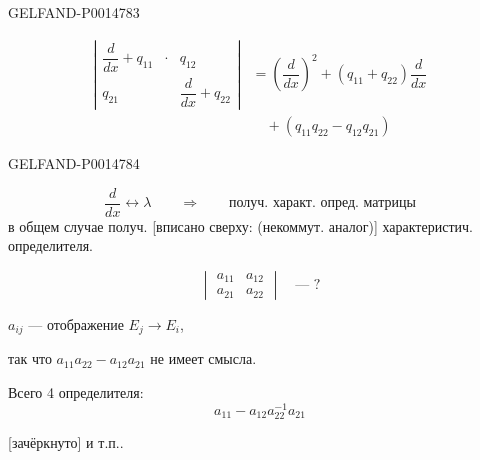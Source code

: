 \begin{GelfandAdjacentEvidence}{GELFAND-P001478}{3}


\begin{equation*}
\begin{aligned}
\left|\begin{array}{ccc}
\dfrac{d}{dx}+q_{11}&\cdot&q_{12}\\
q_{21}&&\dfrac{d}{dx}+q_{22}
\end{array}\right|
 &=\left(\dfrac{d}{dx}\right)^2+(q_{11}+q_{22})\dfrac{d}{dx}\\
 &\quad+(q_{11}q_{22}-q_{12}q_{21})
\end{aligned}
\tag{2}
\end{equation*}
\end{GelfandAdjacentEvidence}
\begin{GelfandAdjacentEvidence}{GELFAND-P001478}{4}


\[
\frac{d}{dx}\longleftrightarrow\lambda
\qquad\Longrightarrow\qquad\text{получ. характ. опред. матрицы}
\]
в общем случае получ. [вписано сверху: (некоммут. аналог)]
характеристич. определителя.

\[
\begin{vmatrix}
a_{11}&a_{12}\\a_{21}&a_{22}
\end{vmatrix}
\quad\text{— ?}
\]

\(a_{ij}\) — отображение \(E_j\to E_i\),

так что \(a_{11}a_{22}-a_{12}a_{21}\) не имеет смысла.

Всего 4 определителя:
\begin{equation*}
a_{11}-a_{12}a_{22}^{-1}a_{21}
\tag{3}
\end{equation*}

[зачёркнуто] и т.п..
\end{GelfandAdjacentEvidence}



